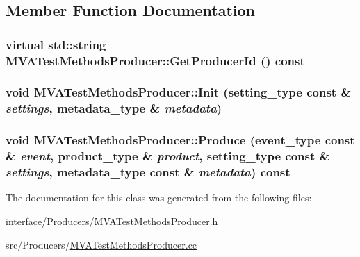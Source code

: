 \subsection{Member Function Documentation}
\hypertarget{classMVATestMethodsProducer_a1795ecbaa668fc1f9492bcd69e76a3d7}{
\subsubsection[{GetProducerId}]{\setlength{\rightskip}{0pt plus 5cm}virtual std::string MVATestMethodsProducer::GetProducerId () const}}
\label{classMVATestMethodsProducer_a1795ecbaa668fc1f9492bcd69e76a3d7}
\hypertarget{classMVATestMethodsProducer_ab506b8dbdd00dce1bfd273877da3bf5f}{
\subsubsection[{Init}]{\setlength{\rightskip}{0pt plus 5cm}void MVATestMethodsProducer::Init (setting\_\-type const \& {\em settings}, \/  metadata\_\-type \& {\em metadata})}}
\label{classMVATestMethodsProducer_ab506b8dbdd00dce1bfd273877da3bf5f}
\hypertarget{classMVATestMethodsProducer_ad462de17d5f9e2cf8379dc9e8d502f1c}{
\subsubsection[{Produce}]{\setlength{\rightskip}{0pt plus 5cm}void MVATestMethodsProducer::Produce (event\_\-type const \& {\em event}, \/  product\_\-type \& {\em product}, \/  setting\_\-type const \& {\em settings}, \/  metadata\_\-type const \& {\em metadata}) const}}
\label{classMVATestMethodsProducer_ad462de17d5f9e2cf8379dc9e8d502f1c}


The documentation for this class was generated from the following files:\begin{DoxyCompactItemize}
\item 
interface/Producers/\hyperlink{MVATestMethodsProducer_8h}{MVATestMethodsProducer.h}\item 
src/Producers/\hyperlink{MVATestMethodsProducer_8cc}{MVATestMethodsProducer.cc}\end{DoxyCompactItemize}
